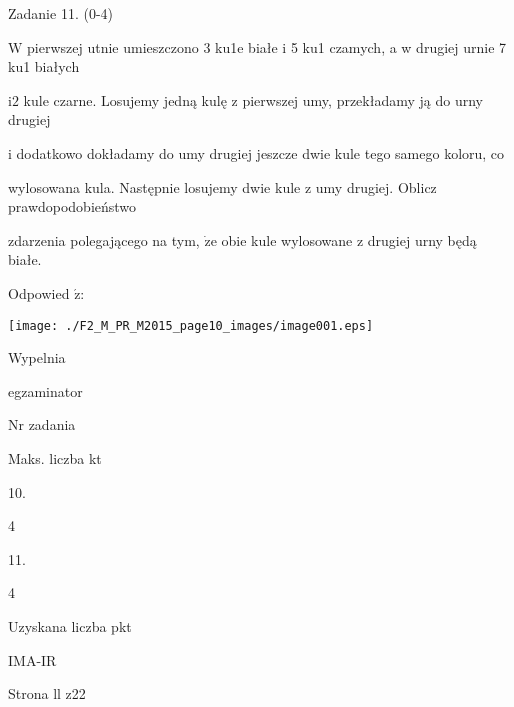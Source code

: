 \documentclass[a4paper,12pt]{article}
\begin{document}
Zadanie 11. (0-4)

$\mathrm{W}$ pierwszej utnie umieszczono 3 ku1e białe i 5 ku1 czamych, a w drugiej urnie 7 ku1 białych

$\mathrm{i}2$ kule czarne. Losujemy jedną kulę z pierwszej umy, przekładamy ją do urny drugiej

i dodatkowo dokładamy do umy drugiej jeszcze dwie kule tego samego koloru, co

wylosowana kula. Następnie losujemy dwie kule z umy drugiej. Oblicz prawdopodobieństwo

zdarzenia polegającego na tym, $\dot{\mathrm{z}}\mathrm{e}$ obie kule wylosowane z drugiej urny będą białe.

Odpowied $\acute{\mathrm{z}}$:
\begin{center}
\texttt{[image: ./F2\_M\_PR\_M2015\_page10\_images/image001.eps]}
\end{center}
Wypelnia

egzaminator

Nr zadania

Maks. liczba kt

10.

4

11.

4

Uzyskana liczba pkt

IMA-IR

Strona ll z22
\end{document}
